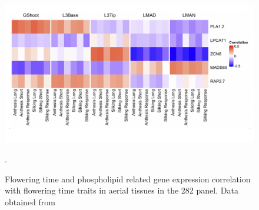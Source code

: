 \documentclass[9pt,twocolumn,twoside,lineno]{BioRxiv}
\begin{document}
\clearpage

\begin{figure}[t]
\begin{center}
\includegraphics[width=0.6 \paperwidth]{Sup_Figures/Sup_Fig_7.png}
\caption{Flowering time and phospholipid related gene expression correlation with flowering time traits in aerial tissues in the 282 panel. 
Data obtained from \cite{Kremling2018-gn}}.
\label{SupFig7}
\end{center}
\end{figure} 

\clearpage



\end{document}
